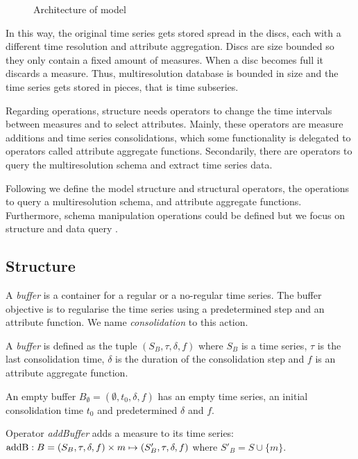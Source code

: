 \begin{figure}
  \centering
  
  \caption{Architecture of  model}
  \label{fig:model:mtsdb}
\end{figure}


In this way, the original time series gets stored spread in the discs,
each with a different time resolution and attribute aggregation.
Discs are size bounded so they only contain a fixed amount of
measures. When a disc becomes full it discards a measure. Thus,
multiresolution database is bounded in size and the time series gets
stored in pieces, that is time subseries.

Regarding operations,  structure needs operators to change
the time intervals between measures and to select attributes. Mainly,
these operators are measure additions and time series consolidations,
which some functionality is delegated to operators called attribute
aggregate functions. Secondarily, there are operators to query the
multiresolution schema and extract time series data.


Following we define the  model structure and structural
operators, the operations to query a multiresolution schema, and
attribute aggregate functions.  Furthermore, schema manipulation
operations could be defined but we focus on structure and data query .


\subsection{Structure}

A \emph{buffer} is a container for a regular or a no-regular time
series. The buffer objective is to regularise the time series using a
predetermined step and an attribute function. We name
\emph{consolidation} to this action.
\begin{definition}%
  A \emph{buffer} is defined as the tuple $(S_B,\tau,\delta,f)$ where
  $S_B$ is a time series, $\tau$ is the last consolidation time,
  $\delta$ is the duration of the consolidation step and $f$ is an
  attribute aggregate function.

  An empty buffer $B_{\emptyset} = (\emptyset,t_0, \delta, f)$ has an
  empty time series, an initial consolidation time $t_0$ and
  predetermined $\delta$ and $f$.
\end{definition}

Operator \emph{addBuffer} adds a measure to its time series:
$\operatorname{addB}: B = (S_B,\tau,\delta,f) \times m \mapsto
(S'_B,\tau,\delta,f)$ where $S'_B = S \cup \{m\} $.

